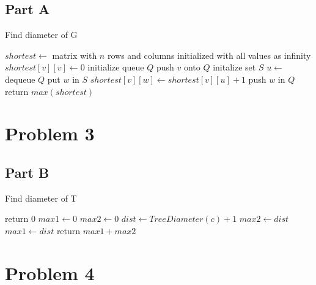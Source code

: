 \documentclass[12pt]{article}
\begin{document}
\subsection*{Part A}
\vspace{-5mm}
\begin{algorithm}
\caption{Find diameter of G}
\begin{algorithmic}[1]
    \State $shortest \gets$ matrix with $n$ rows and columns initialized with all values as infinity
        \State $shortest[v][v] \gets 0$
        \State initialize queue $Q$
        \State push $v$ onto $Q$
        \State initalize set $S$
            \State $u \gets $ dequeue $Q$
                    \State put $w$ in $S$
                    \State $shortest[v][w] \gets shortest[v][u] + 1$
                    \State push $w$ in $Q$
                \EndIf
            \EndFor
        \EndWhile
    \EndFor
    \State return $max(shortest)$
\end{algorithmic}
\end{algorithm}

\newpage
\section*{Problem 3}

\subsection*{Part B}
\vspace{-5mm}
\begin{algorithm}
\caption{Find diameter of T}
\begin{algorithmic}[1]
            \State return $0$
        \EndIf
        \State $max1 \gets 0$
        \State $max2 \gets 0$
            \State $dist \gets TreeDiameter(c) + 1$
                    \State $max2 \gets dist$
                \Else
                    \State $max1 \gets dist$
                \EndIf
            \EndIf
        \EndFor
        \State return $max1 + max2$
    \EndFunction
\end{algorithmic}
\end{algorithm}

\newpage
\section*{Problem 4}
\end{document}
